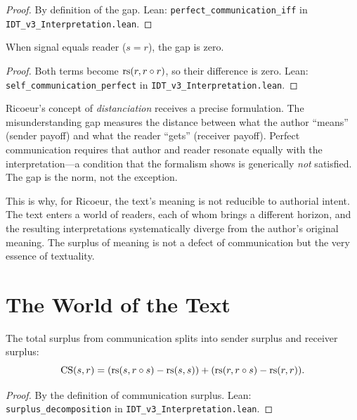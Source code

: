 \begin{proof}
By definition of the gap.
Lean: \texttt{perfect\_communication\_iff} in \texttt{IDT\_v3\_Interpretation.lean}.
\end{proof}

\begin{theorem}
\label{thm:self-comm}
When signal equals reader ($s = r$), the gap is zero.
\end{theorem}

\begin{proof}
Both terms become $\mathrm{rs}(r, r \circ r)$, so their difference is zero.
Lean: \texttt{self\_communication\_perfect} in \texttt{IDT\_v3\_Interpretation.lean}.
\end{proof}

\begin{interpretation}
\label{interp:distanciation}
Ricoeur's concept of \textit{distanciation} receives a precise formulation.
The misunderstanding gap measures the distance between what the author
``means'' (sender payoff) and what the reader ``gets'' (receiver payoff).
Perfect communication requires that author and reader resonate equally with the
interpretation---a condition that the formalism shows is generically
\emph{not} satisfied. The gap is the norm, not the exception.

This is why, for Ricoeur, the text's meaning is not reducible to authorial
intent. The text enters a world of readers, each of whom brings a different
horizon, and the resulting interpretations systematically diverge from the
author's original meaning. The surplus of meaning is not a defect of
communication but the very essence of textuality.
\end{interpretation}

\section{The World of the Text}

\begin{theorem}
\label{thm:surplus-decomp}
The total surplus from communication splits into sender surplus and receiver
surplus:
\[
\mathrm{CS}(s, r) = (\mathrm{rs}(s, r \circ s) - \mathrm{rs}(s, s)) +
(\mathrm{rs}(r, r \circ s) - \mathrm{rs}(r, r)).
\]
\end{theorem}

\begin{proof}
By the definition of communication surplus.
Lean: \texttt{surplus\_decomposition} in \texttt{IDT\_v3\_Interpretation.lean}.
\end{proof}

